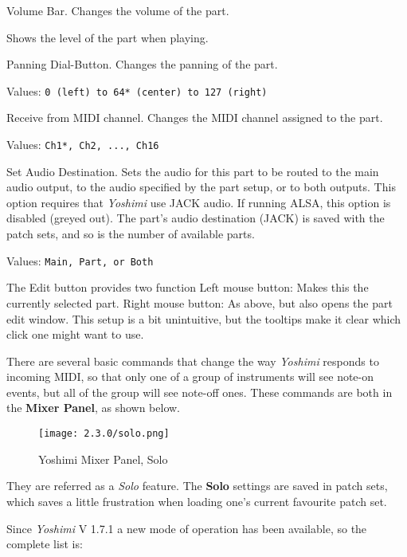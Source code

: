    Volume Bar.
   Changes the volume of the part.

   Shows the level of the part when playing.

   Panning Dial-Button.
   Changes the panning of the part.

   Values: \texttt{0 (left) to 64* (center) to 127 (right)}

   Receive from MIDI channel.
   Changes the MIDI channel assigned to the part.

   Values: \texttt{Ch1*, Ch2, ..., Ch16}

   Set Audio Destination.
   Sets the audio for this part to be routed to the main audio output, to
   the audio specified by the part setup, or to both outputs.
   This option requires that \textsl{Yoshimi} use JACK audio.  If running
   ALSA, this option is disabled (greyed out).
   The part's audio destination (JACK) is saved with the patch sets, and
   so is the number of available parts.

   Values: \texttt{Main, Part, or Both}

   The Edit button provides two function
   Left mouse button: Makes this the currently selected part.
   Right mouse button: As above, but also opens the part edit window.
   This setup is a bit unintuitive, but the tooltips make it clear
   which click one might want to use.

   There are several basic commands that change the way
   \textsl{Yoshimi} responds to incoming MIDI,
   so that only one of a group of instruments will see note-on events, but all
   of the group will see note-off ones. These commands
   are both in the \textbf{Mixer Panel}, as shown below.
\begin{figure}[H]
   \centering
   \texttt{[image: 2.3.0/solo.png]}
   \caption[Yoshimi Mixer Panel]{Yoshimi Mixer Panel, Solo}
   \label{fig:yoshimi_part_panel_solo}
\end{figure}
   They are referred as a \textsl{Solo} feature.
   The \textbf{Solo} settings are saved in patch sets, which saves a
   little frustration when loading one's current favourite patch set.

   Since \textsl{Yoshimi} V 1.7.1 a new mode of operation has been available, so the complete list is:

